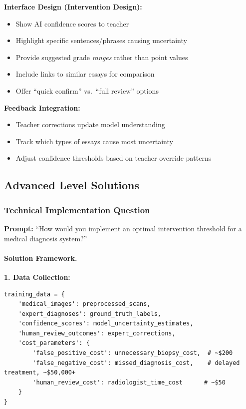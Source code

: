 \textbf{Interface Design (Intervention Design):}
\begin{itemize}
    \item Show AI confidence scores to teacher
    \item Highlight specific sentences/phrases causing uncertainty
    \item Provide suggested grade \emph{ranges} rather than point values
    \item Include links to similar essays for comparison
    \item Offer ``quick confirm'' vs.\ ``full review'' options
\end{itemize}

\textbf{Feedback Integration:}
\begin{itemize}
    \item Teacher corrections update model understanding
    \item Track which types of essays cause most uncertainty
    \item Adjust confidence thresholds based on teacher override patterns
\end{itemize}

\subsection{Advanced Level Solutions}

\subsubsection{Technical Implementation Question}

\textbf{Prompt:} ``How would you implement an optimal intervention threshold for a medical diagnosis system?''

\paragraph{Solution Framework.}

\textbf{1. Data Collection:}
\begin{lstlisting}[style=python, caption={Medical AI data collection setup}]
training_data = {
    'medical_images': preprocessed_scans,
    'expert_diagnoses': ground_truth_labels,
    'confidence_scores': model_uncertainty_estimates,
    'human_review_outcomes': expert_corrections,
    'cost_parameters': {
        'false_positive_cost': unnecessary_biopsy_cost,  # ~$200
        'false_negative_cost': missed_diagnosis_cost,    # delayed treatment, ~$50,000+
        'human_review_cost': radiologist_time_cost      # ~$50
    }
}
\end{lstlisting}

